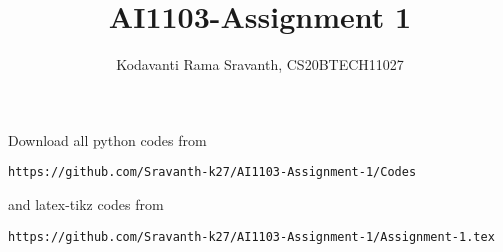 \documentclass[journal,12pt,twocolumn]{IEEEtran}
\DeclareMathOperator*{\Res}{Res}
\begin{document}
\newcommand{\BEQA}{\begin{eqnarray}}
\newcommand{\EEQA}{\end{eqnarray}}
\newcommand{\define}{\stackrel{\triangle}{=}}

\raggedbottom
\setlength{\parindent}{0pt}
\providecommand{\mbf}{\mathbf}
\providecommand{\pr}[1]{\ensuremath{\Pr\left(#1\right)}}
\providecommand{\qfunc}[1]{\ensuremath{Q\left(#1\right)}}
\providecommand{\sbrak}[1]{\ensuremath{{}\left[#1\right]}}
\providecommand{\lsbrak}[1]{\ensuremath{{}\left[#1\right.}}
\providecommand{\rsbrak}[1]{\ensuremath{{}\left.#1\right]}}
\providecommand{\brak}[1]{\ensuremath{\left(#1\right)}}
\providecommand{\lbrak}[1]{\ensuremath{\left(#1\right.}}
\providecommand{\rbrak}[1]{\ensuremath{\left.#1\right)}}
\providecommand{\cbrak}[1]{\ensuremath{\left\{#1\right\}}}
\providecommand{\lcbrak}[1]{\ensuremath{\left\{#1\right.}}
\providecommand{\rcbrak}[1]{\ensuremath{\left.#1\right\}}}
\theoremstyle{remark}
\newtheorem{rem}{Remark}
\newcommand{\sgn}{\mathop{\mathrm{sgn}}}
\providecommand{\abs}[1]{\vert#1\vert}
\providecommand{\res}[1]{\Res\displaylimits_{#1}} 
\providecommand{\norm}[1]{\lVert#1\rVert}
\providecommand{\mtx}[1]{\mathbf{#1}}
\providecommand{\mean}[1]{E[ #1 ]}
\providecommand{\fourier}{\overset{\mathcal{F}}{ \rightleftharpoons}}
\providecommand{\system}{\overset{\mathcal{H}}{ \longleftrightarrow}}
\newcommand{\solution}{\noindent \textbf{Solution: }}
\newcommand{\cosec}{\,\text{cosec}\,}
\providecommand{\dec}[2]{\ensuremath{\overset{#1}{\underset{#2}{\gtrless}}}}
\newcommand{\myvec}[1]{\ensuremath{\begin{pmatrix}#1\end{pmatrix}}}
\newcommand{\mydet}[1]{\ensuremath{\begin{vmatrix}#1\end{vmatrix}}}
\makeatletter
{}
\makeatother
\let\StandardTheFigure\thefigure
\let\vec\mathbf
\renewcommand{\thefigure}{\theproblem}
\def\putbox#1#2#3{\makebox[0in][l]{\makebox[#1][l]{}\raisebox{\baselineskip}[0in][0in]{\raisebox{#2}[0in][0in]{#3}}}}
     \def\rightbox#1{\makebox[0in][r]{#1}}
     \def\centbox#1{\makebox[0in]{#1}}
     \def\topbox#1{\raisebox{-\baselineskip}[0in][0in]{#1}}
     \def\midbox#1{\raisebox{-0.5\baselineskip}[0in][0in]{#1}}
\vspace{3cm}
\title{AI1103-Assignment 1}
\author{Kodavanti Rama Sravanth, CS20BTECH11027}
\maketitle
\newpage
\bigskip
\renewcommand{\thefigure}{\theenumi}
\renewcommand{\thetable}{\theenumi}
Download all python codes from 
\begin{lstlisting}
https://github.com/Sravanth-k27/AI1103-Assignment-1/Codes
\end{lstlisting}
%
and latex-tikz codes from 
%
\begin{lstlisting}
https://github.com/Sravanth-k27/AI1103-Assignment-1/Assignment-1.tex
\end{lstlisting}
\end{document}
